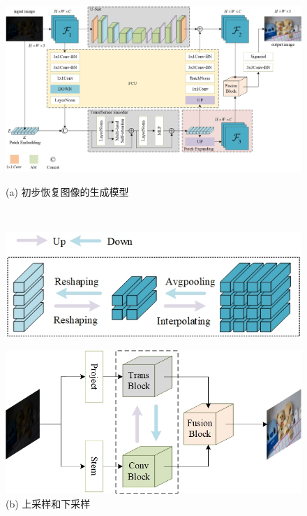 \documentclass[CJK,aspectratio=169]{beamer}  %
\begin{document}
\begin{frame}
\begin{figure}
\begin{minipage}{.4\textwidth}
\begin{itemize}
				\end{itemize}
				\captionsetup{font=scriptsize}
				\label{fig: Abstract}
			\end{minipage}
			\begin{minipage}{.58\textwidth}
				\centering
				\includegraphics[width=.88\linewidth]{picture/LLIE/My Architecture/The proposed initial architecture.jpg}
				\captionsetup{font=scriptsize}
				\label{fig: PACUT}	
				\caption*{\tiny (a) 初步恢复图像的生成模型}
			\end{minipage}\\
			\hfill
			\begin{minipage}{.28\textwidth}
				\includegraphics[width=.88\linewidth]{picture/LLIE/My Architecture/Up-sampling and down-sampling.jpg}
				\captionsetup{font=scriptsize}
				\label{fig: Up-sampling and down-sampling}	
				\caption*{\tiny (b) 上采样和下采样}
			\end{minipage}
			\begin{minipage}{.28\textwidth}
				\includegraphics[width=.88\linewidth]{picture/LLIE/My Architecture/The proposed initial architecture(Abstract Picture).jpg}

\end{minipage}
\end{figure}
\end{frame}
\end{document}
